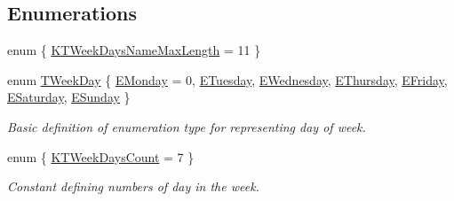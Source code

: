 \subsection*{Enumerations}
\begin{DoxyCompactItemize}
\item 
enum \{ \hyperlink{namespace_c_value___t_week_day_ae2f386969b6b243f70cc768d81d87f37a82610dbf312a8592086eff40a38e1ff8}{K\+T\+Week\+Days\+Name\+Max\+Length} = 11
 \}
\item 
enum \hyperlink{namespace_c_value___t_week_day_a6412f204509f223b789fb5f1a61a6124}{T\+Week\+Day} \{ \newline
\hyperlink{namespace_c_value___t_week_day_a6412f204509f223b789fb5f1a61a6124a13c1447b2f5be5b292b403d71b5460b9}{E\+Monday} = 0, 
\hyperlink{namespace_c_value___t_week_day_a6412f204509f223b789fb5f1a61a6124ac54a40e76745b36a2315ffed4edbce80}{E\+Tuesday}, 
\hyperlink{namespace_c_value___t_week_day_a6412f204509f223b789fb5f1a61a6124ac611066963726ce53657cedaaaefc3d5}{E\+Wednesday}, 
\hyperlink{namespace_c_value___t_week_day_a6412f204509f223b789fb5f1a61a6124a7fb51985580d1ba92e55f2577a04b3b1}{E\+Thursday}, 
\newline
\hyperlink{namespace_c_value___t_week_day_a6412f204509f223b789fb5f1a61a6124a5d2ecb8bb6c29d8ecbfc5901ab383978}{E\+Friday}, 
\hyperlink{namespace_c_value___t_week_day_a6412f204509f223b789fb5f1a61a6124ab3e8b0a563537c9cd6ef20d06b486100}{E\+Saturday}, 
\hyperlink{namespace_c_value___t_week_day_a6412f204509f223b789fb5f1a61a6124ad4ed77e2d38772a8a5f77e9f87621117}{E\+Sunday}
 \}\begin{DoxyCompactList}\small\item\em Basic definition of enumeration type for representing day of week. \end{DoxyCompactList}
\item 
enum \{ \hyperlink{namespace_c_value___t_week_day_aafc13db7f1761bc02fc24499d9d30ef8aa662532b91895c243892c79eaafea534}{K\+T\+Week\+Days\+Count} = 7
 \}\begin{DoxyCompactList}\small\item\em Constant defining numbers of day in the week. \end{DoxyCompactList}
\end{DoxyCompactItemize}
